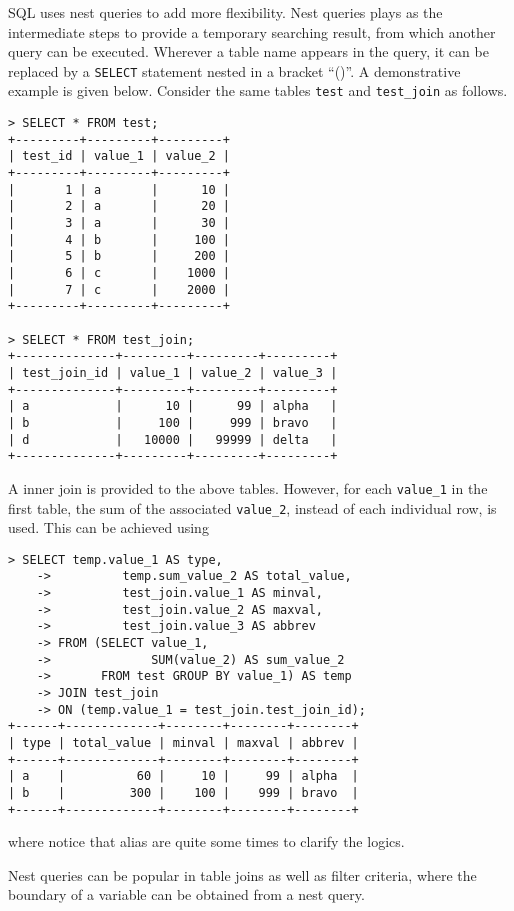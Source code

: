 SQL uses nest queries to add more flexibility. Nest queries plays as the intermediate steps to provide a temporary searching result, from which another query can be executed. Wherever a table name appears in the query, it can be replaced by a \verb|SELECT| statement nested in a bracket ``()''. A demonstrative example is given below. Consider the same tables \verb|test| and \verb|test_join| as follows.
\begin{lstlisting}
> SELECT * FROM test;
+---------+---------+---------+
| test_id | value_1 | value_2 |
+---------+---------+---------+
|       1 | a       |      10 |
|       2 | a       |      20 |
|       3 | a       |      30 |
|       4 | b       |     100 |
|       5 | b       |     200 |
|       6 | c       |    1000 |
|       7 | c       |    2000 |
+---------+---------+---------+

> SELECT * FROM test_join;
+--------------+---------+---------+---------+
| test_join_id | value_1 | value_2 | value_3 |
+--------------+---------+---------+---------+
| a            |      10 |      99 | alpha   |
| b            |     100 |     999 | bravo   |
| d            |   10000 |   99999 | delta   |
+--------------+---------+---------+---------+
\end{lstlisting}
A inner join is provided to the above tables. However, for each \verb|value_1| in the first table, the sum of the associated \verb|value_2|, instead of each individual row, is used. This can be achieved using
\begin{lstlisting}
> SELECT temp.value_1 AS type,
    ->          temp.sum_value_2 AS total_value,
    ->          test_join.value_1 AS minval,
    ->          test_join.value_2 AS maxval,
    ->          test_join.value_3 AS abbrev
    -> FROM (SELECT value_1,
    ->              SUM(value_2) AS sum_value_2
    ->       FROM test GROUP BY value_1) AS temp
    -> JOIN test_join
    -> ON (temp.value_1 = test_join.test_join_id);
+------+-------------+--------+--------+--------+
| type | total_value | minval | maxval | abbrev |
+------+-------------+--------+--------+--------+
| a    |          60 |     10 |     99 | alpha  |
| b    |         300 |    100 |    999 | bravo  |
+------+-------------+--------+--------+--------+
\end{lstlisting}
where notice that alias are quite some times to clarify the logics.

Nest queries can be popular in table joins as well as filter criteria, where the boundary of a variable can be obtained from a nest query.

